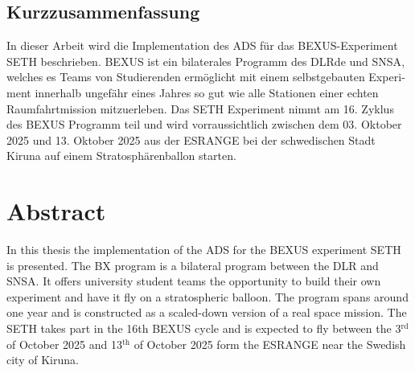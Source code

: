 \begin{otherlanguage}{ngerman}
\chapter*{Kurzzusammenfassung}
In dieser Arbeit wird die Implementation des \acf{ADS} für das \acs{BEXUS}-Experiment \ac{SETH} beschrieben. \acf{BEXUS} ist ein bilaterales Programm des \acf{DLRde} und \ac{SNSA}, welches es Teams von Studierenden ermöglicht mit einem selbstgebauten Experiment innerhalb ungefähr eines Jahres so gut wie alle Stationen einer echten Raumfahrtmission mitzuerleben. Das \ac{SETH} Experiment nimmt am 16. Zyklus des \ac{BEXUS} Programm teil und wird vorraussichtlich zwischen dem 03. Oktober 2025 und 13. Oktober 2025 aus der \ac{ESRANGE} bei der schwedischen Stadt Kiruna auf einem Stratosphärenballon starten.
\end{otherlanguage}


\chapter*{Abstract}
In this thesis the implementation of the \acf{ADS} for the \acf{BEXUS} experiment \acf{SETH} is presented. The \acf{BX} program is a bilateral program between the \acf{DLR} and \ac{SNSA}. It offers university student teams the opportunity to build their own experiment and have it fly on a stratospheric balloon. The program spans around one year and is constructed as a scaled-down version of a real space mission. The \acf{SETH} takes part in the 16th \ac{BEXUS} cycle and is expected to fly between the 3$^\mathrm{rd}$ of October 2025 and 13$^\mathrm{th}$ of October 2025 form the \acf{ESRANGE} near the Swedish city of Kiruna.